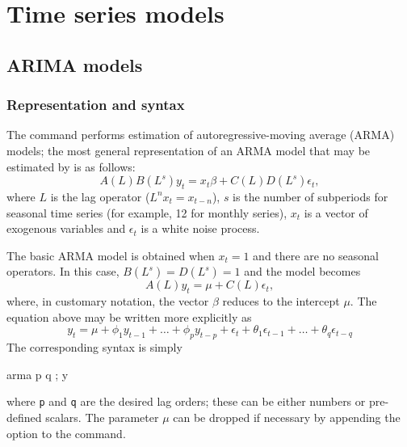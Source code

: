 \chapter{Time series models}
\label{chap:timeser}

\section{ARIMA models}
\label{arma-estimation}

\subsection{Representation and syntax}
\label{arma-repr}

The  command performs estimation of autoregressive-moving
average (ARMA) models; the most general representation of an ARMA
model that may be estimated by  is as follows:
\begin{equation}
  \label{eq:general-arma}
  A(L) B(L^s) y_t = x_t \beta + C(L) D(L^s) \epsilon_t ,
\end{equation}
where $L$ is the lag operator ($L^n x_t = x_{t-n}$), $s$ is the
number of subperiods for seasonal time series (for example, 12 for
monthly series), $x_t$ is a vector of exogenous variables and
$\epsilon_t$ is a white noise process.

The basic ARMA model is obtained when $x_t = 1$ and there are no
seasonal operators. In this case, $B(L^s) = D(L^s) = 1$ and the model
becomes
\begin{equation}
  \label{eq:plain-arma}
  A(L) y_t = \mu + C(L) \epsilon_t ,
\end{equation}
where, in customary notation, the vector $\beta$ reduces to the
intercept $\mu$.  The equation above may be written more explicitly
as
\[
  y_t = \mu + \phi_1 y_{t-1} + \ldots + \phi_p y_{t-p} + 
  \epsilon_t + \theta_1 \epsilon_{t-1} + \ldots + \theta_q
  \epsilon_{t-q} 
\]
The corresponding  syntax is simply
\begin{code}
  arma p q ; y
\end{code}
where \verb|p| and \verb|q| are the desired lag orders; these can be
either numbers or pre-defined scalars. The parameter $\mu$ can be
dropped if necessary by appending the option  to the command.


